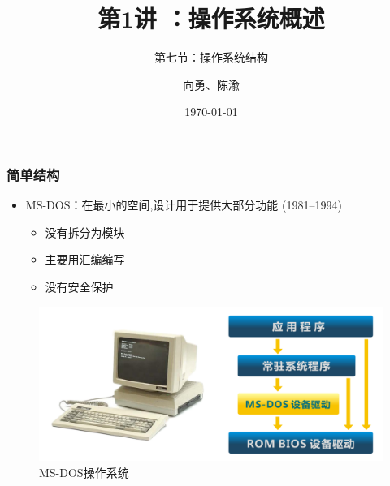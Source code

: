 \documentclass[UTF8]{ctexbeamer}
\title[第1讲]{第1讲 ：操作系统概述} %
\subtitle{第七节：操作系统结构}
\author{向勇、陈渝} %
\institute[清华大学] %
{
清华大学计算机系 \\ %
\medskip
\textit{xyong,yuchen@tsinghua.edu.cn} %
}
\date{\today} %
\begin{document}
\begin{frame}
\titlepage %
\end{frame}

%
%

\begin{frame}

\frametitle{简单结构}

\begin{itemize}
\item MS-DOS：在最小的空间,设计用于提供大部分功能 (1981--1994)
	\begin{itemize}
	\item 没有拆分为模块
	\item 主要用汇编编写
	\item 没有安全保护
	\end{itemize}
\end{itemize}
	\begin{figure}
	\centering
	\includegraphics[width=0.6\linewidth]{msdos}
	\caption{MS-DOS操作系统}
\end{figure}

\end{frame}
\end{document}
